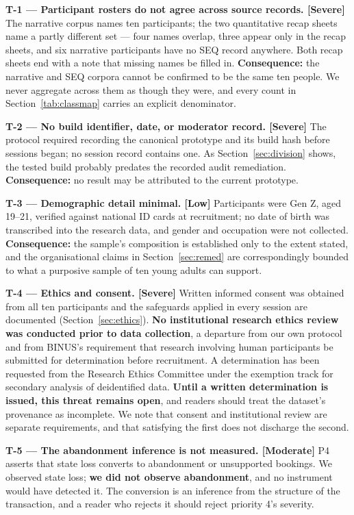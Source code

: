 \documentclass[]{interact}
\theoremstyle{plain}
\begin{document}
\textbf{T-1 --- Participant rosters do not agree across source records. [Severe]} The narrative corpus
names ten participants; the two quantitative recap sheets name a partly different set --- four names
overlap, three appear only in the recap sheets, and six narrative participants have no SEQ record
anywhere. Both recap sheets end with a note that missing names be filled in. \textbf{Consequence:} the
narrative and SEQ corpora cannot be confirmed to be the same ten people. We never aggregate across them
as though they were, and every count in Section~\ref{tab:classmap} carries an explicit denominator.

\textbf{T-2 --- No build identifier, date, or moderator record. [Severe]} The protocol required recording
the canonical prototype and its build hash before sessions began; no session record contains one. As
Section~\ref{sec:division} shows, the tested build probably predates the recorded audit remediation.
\textbf{Consequence:} no result may be attributed to the current prototype.

\textbf{T-3 --- Demographic detail minimal. [Low]} Participants were Gen Z, aged 19--21, verified against
national ID cards at recruitment; no date of birth was transcribed into the research data, and gender
and occupation were not collected. \textbf{Consequence:} the sample's composition is established only
to the extent stated, and the organisational claims in Section~\ref{sec:remed} are correspondingly
bounded to what a purposive sample of ten young adults can support.

\textbf{T-4 --- Ethics and consent. [Severe]} Written informed consent was obtained from all ten
participants and the safeguards applied in every session are documented
(Section~\ref{sec:ethics}). \textbf{No institutional research ethics review was conducted prior to data
collection}, a departure from our own protocol and from BINUS's requirement that research involving
human participants be submitted for determination before recruitment. A determination has been
requested from the Research Ethics Committee under the exemption track for secondary analysis of
deidentified data. \textbf{Until a written determination is issued, this threat remains open}, and
readers should treat the dataset's provenance as incomplete. We note that consent and institutional
review are separate requirements, and that satisfying the first does not discharge the second.

\textbf{T-5 --- The abandonment inference is not measured. [Moderate]} P4 asserts that state loss
converts to abandonment or unsupported bookings. We observed state loss; \textbf{we did not observe
abandonment}, and no instrument would have detected it. The conversion is an inference from the
structure of the transaction, and a reader who rejects it should reject priority 4's severity.
\end{document}
